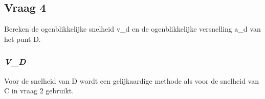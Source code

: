 \documentclass{article}
\begin{document}
\subsection{\textbf{Vraag 4}}
\begin{maplelatex}\begin{Maple Normal}{
Bereken de ogenblikkelijke snelheid v\_d en de ogenblikkelijke versnelling a\_d van het punt D.}\end{Maple Normal}
\end{maplelatex}
\subsubsection{\textbf{\textit{V\_D}}}
\begin{maplelatex}\begin{Maple Normal}{
Voor de snelheid van D wordt een gelijkaardige methode als voor de snelheid van C in vraag 2 gebruikt.}\end{Maple Normal}
\end{maplelatex}
\begin{maplegroup}
\begin{mapleinput}
\end{mapleinput}
\mapleresult
{}
\end{maplegroup}
\end{document}
